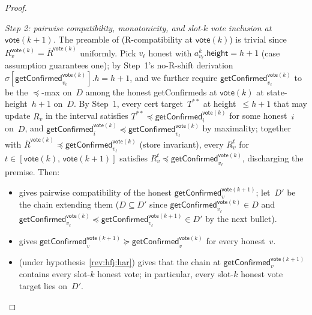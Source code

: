\ifx\litemode\undefined\documentclass{article}\fi
\newcommand{\height}{\mathsf{height}}
\newcommand{\vote}{\mathsf{vote}}
\newcommand{\comm}[1]{\bar{#1}}
\newcommand{\getConfirmed}{\textsf{getConfirmed}\xspace}
\theoremstyle{plain}
\theoremstyle{definition}
\theoremstyle{remark}
\begin{document}
\begin{proof}
\begin{description}
\emph{Step 2: pairwise compatibility, monotonicity, and slot-$k$ vote inclusion at $\vote(k+1)$.}
The preamble of  (R-compatibility at $\vote(k)$) is trivial since $R_v^{\vote(k)} = \comm{R}^{\vote(k)}$ uniformly. Pick $v_\ell$ honest with $a^k_{v_\ell}.\height = h+1$ (case assumption guarantees one); by Step~1's no-R-shift derivation $\sigma[\getConfirmed_{v_\ell}^{\vote(k)}].h = h+1$, and we further require $\getConfirmed_{v_\ell}^{\vote(k)}$ to be the $\preceq$-max on~$D$ among the honest \getConfirmed{}s at $\vote(k)$ at state-height~$h+1$ on~$D$. By Step~1, every cert target~$T^{**}$ at height~$\leq h+1$ that may update $R_v$ in the interval satisfies $T^{**} \preceq \getConfirmed_i^{\vote(k)}$ for some honest~$i$ on~$D$, and $\getConfirmed_i^{\vote(k)} \preceq \getConfirmed_{v_\ell}^{\vote(k)}$ by maximality; together with $\comm{R}^{\vote(k)} \preceq \getConfirmed_{v_\ell}^{\vote(k)}$ (store invariant), every $R_v^t$ for $t \in [\vote(k),\, \vote(k+1)]$ satisfies $R_v^t \preceq \getConfirmed_{v_\ell}^{\vote(k)}$, discharging the premise. Then:
\begin{itemize}
  \item {} gives pairwise compatibility of the honest $\getConfirmed_v^{\vote(k+1)}$; let~$D'$ be the chain extending them ($D \subseteq D'$ since $\getConfirmed_{v_\ell}^{\vote(k)} \in D$ and $\getConfirmed_{v_\ell}^{\vote(k)} \preceq \getConfirmed_{v_\ell}^{\vote(k+1)} \in D'$ by the next bullet).
  \item {} gives $\getConfirmed_v^{\vote(k+1)} \succeq \getConfirmed_v^{\vote(k)}$ for every honest~$v$.
  \item {} (under hypothesis~\ref{rev:hfj:har}) gives that the chain at $\getConfirmed_v^{\vote(k+1)}$ contains every slot-$k$ honest vote; in particular, every slot-$k$ honest vote target lies on~$D'$.
\end{itemize}


\end{description}
\end{proof}
\end{document}
